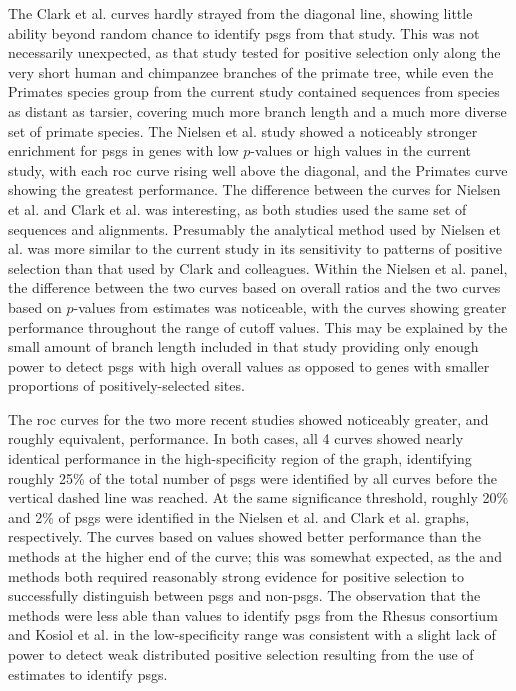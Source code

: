 The Clark et al. \citeyearpar{Clark2003} curves hardly strayed from
the diagonal line, showing little ability beyond random chance to
identify \acp{psg} from that study. This was not necessarily
unexpected, as that study tested for positive selection only along the
very short human and chimpanzee branches of the primate tree, while
even the Primates species group from the current study contained
sequences from species as distant as tarsier, covering much more
branch length and a much more diverse set of primate species. The
Nielsen et al. \citeyearpar{Nielsen2005} study showed a noticeably
stronger enrichment for \acp{psg} in genes with low $p$-values or high
\dnds values in the current study, with each \ac{roc} curve rising
well above the diagonal, and the Primates \dnds curve showing the
greatest performance. The difference between the curves for Nielsen et
al. and Clark et al. was interesting, as both studies used the same
set of sequences and alignments. Presumably the analytical method used
by Nielsen et al. was more similar to the current study in its
sensitivity to patterns of positive selection than that used by Clark
and colleagues. Within the Nielsen et al. panel, the difference
between the two curves based on overall \dnds ratios and the two
curves based on $p$-values from \sw estimates was noticeable, with the
\dnds curves showing greater performance throughout the range of
cutoff values. This may be explained by the small amount of branch
length included in that study providing only enough power to detect
\acp{psg} with high overall \dnds values as opposed to genes with
smaller proportions of positively-selected sites.

The \ac{roc} curves for the two more recent studies showed noticeably
greater, and roughly equivalent, performance. In both cases, all 4
curves showed nearly identical performance in the high-specificity
region of the graph, identifying roughly 25\% of the total number of
\acp{psg} were identified by all curves before the vertical dashed
line was reached. At the same significance threshold, roughly 20\% and
2\% of \acp{psg} were identified in the Nielsen et al. and Clark et
al. graphs, respectively. The curves based on \dnds values showed
better performance than the \sw methods at the higher end of the
curve; this was somewhat expected, as the \psgeone and \psghoch
methods both required reasonably strong \sw evidence for positive
selection to successfully distinguish between \acp{psg} and
non-\acp{psg}. The observation that the \sw methods were less able
than \dnds values to identify \acp{psg} from the Rhesus consortium and
Kosiol et al. in the low-specificity range was consistent with a
slight lack of power to detect weak distributed positive selection
resulting from the use of \sw estimates to identify \acp{psg}.

